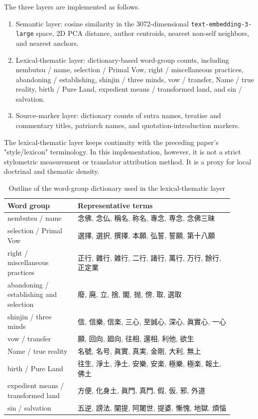 \documentclass[uplatex,dvipdfmx,11pt,a4paper]{jsarticle}
\begin{document}
The three layers are implemented as follows.

\begin{enumerate}
\item Semantic layer: cosine similarity in the 3072-dimensional \texttt{text-embedding-3-large} space, 2D PCA distance, author centroids, nearest non-self neighbors, and nearest anchors.
\item Lexical-thematic layer: dictionary-based word-group counts, including nembutsu / name, selection / Primal Vow, right / miscellaneous practices, abandoning / establishing, shinjin / three minds, vow / transfer, Name / true reality, birth / Pure Land, expedient means / transformed land, and sin / salvation.
\item Source-marker layer: dictionary counts of sutra names, treatise and commentary titles, patriarch names, and quotation-introduction markers.
\end{enumerate}

The lexical-thematic layer keeps continuity with the preceding paper's "style/lexicon" terminology. In this implementation, however, it is not a strict stylometric measurement or translator attribution method. It is a proxy for local doctrinal and thematic density.

\begin{table}[H]
\centering
\footnotesize
\setlength{\tabcolsep}{2pt}
\caption{Outline of the word-group dictionary used in the lexical-thematic layer}
\label{tab:style-lexicon}
\begin{tabular}{@{}p{0.28\linewidth}p{0.62\linewidth}@{}}
\toprule
Word group & Representative terms \\
\midrule
nembutsu / name & 念佛, 念仏, 稱名, 称名, 專念, 専念, 念佛三昧 \\
selection / Primal Vow & 選擇, 選択, 撰擇, 本願, 弘誓, 誓願, 第十八願 \\
right / miscellaneous practices & 正行, 雜行, 雑行, 二行, 諸行, 萬行, 万行, 餘行, 正定業 \\
abandoning / establishing and selection & 廢, 廃, 立, 捨, 閣, 抛, 傍, 取, 選取 \\
shinjin / three minds & 信, 信樂, 信楽, 三心, 至誠心, 深心, 眞實心, 一心 \\
vow / transfer & 願, 回向, 廻向, 往相, 還相, 利他, 欲生 \\
Name / true reality & 名號, 名号, 眞實, 真実, 金剛, 大利, 無上 \\
birth / Pure Land & 往生, 淨土, 浄土, 安樂, 安楽, 極樂, 極楽, 報土, 佛土 \\
expedient means / transformed land & 方便, 化身土, 眞門, 真門, 假, 仮, 邪, 外道 \\
sin / salvation & 五逆, 謗法, 闡提, 阿闍世, 提婆, 慚愧, 地獄, 煩惱 \\
\bottomrule
\end{tabular}
\end{table}
\end{document}
